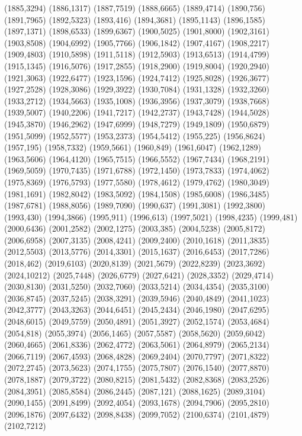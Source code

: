 (1885,3294)
(1886,1317)
(1887,7519)
(1888,6665)
(1889,4714)
(1890,756)
(1891,7965)
(1892,5323)
(1893,416)
(1894,3681)
(1895,1143)
(1896,1585)
(1897,1371)
(1898,6533)
(1899,6367)
(1900,5025)
(1901,8000)
(1902,3161)
(1903,8508)
(1904,6992)
(1905,7766)
(1906,1842)
(1907,4167)
(1908,2217)
(1909,4803)
(1910,5898)
(1911,5118)
(1912,5903)
(1913,6513)
(1914,4799)
(1915,1345)
(1916,5076)
(1917,2855)
(1918,2900)
(1919,8004)
(1920,2940)
(1921,3063)
(1922,6477)
(1923,1596)
(1924,7412)
(1925,8028)
(1926,3677)
(1927,2528)
(1928,3086)
(1929,3922)
(1930,7084)
(1931,1328)
(1932,3260)
(1933,2712)
(1934,5663)
(1935,1008)
(1936,3956)
(1937,3079)
(1938,7668)
(1939,5007)
(1940,2206)
(1941,7217)
(1942,2737)
(1943,7428)
(1944,5028)
(1945,3870)
(1946,2962)
(1947,6999)
(1948,7279)
(1949,1809)
(1950,6879)
(1951,5099)
(1952,5577)
(1953,2373)
(1954,5412)
(1955,225)
(1956,8624)
(1957,195)
(1958,7332)
(1959,5661)
(1960,849)
(1961,6047)
(1962,1289)
(1963,5606)
(1964,4120)
(1965,7515)
(1966,5552)
(1967,7434)
(1968,2191)
(1969,5059)
(1970,7435)
(1971,6788)
(1972,1450)
(1973,7833)
(1974,4062)
(1975,8369)
(1976,5793)
(1977,5580)
(1978,4612)
(1979,4762)
(1980,3049)
(1981,1691)
(1982,8042)
(1983,5092)
(1984,1508)
(1985,6008)
(1986,3485)
(1987,6781)
(1988,8056)
(1989,7090)
(1990,637)
(1991,3081)
(1992,3800)
(1993,430)
(1994,3866)
(1995,911)
(1996,613)
(1997,5021)
(1998,4235)
(1999,481)
(2000,6436)
(2001,2582)
(2002,1275)
(2003,385)
(2004,5238)
(2005,8172)
(2006,6958)
(2007,3135)
(2008,4241)
(2009,2400)
(2010,1618)
(2011,3835)
(2012,5503)
(2013,5776)
(2014,3301)
(2015,1637)
(2016,6453)
(2017,7286)
(2018,462)
(2019,6103)
(2020,8139)
(2021,5679)
(2022,8239)
(2023,3692)
(2024,10212)
(2025,7448)
(2026,6779)
(2027,6421)
(2028,3352)
(2029,4714)
(2030,8130)
(2031,5250)
(2032,7060)
(2033,5214)
(2034,4354)
(2035,3100)
(2036,8745)
(2037,5245)
(2038,3291)
(2039,5946)
(2040,4849)
(2041,1023)
(2042,3777)
(2043,3263)
(2044,6451)
(2045,2434)
(2046,1980)
(2047,6295)
(2048,6015)
(2049,5759)
(2050,4891)
(2051,3927)
(2052,1574)
(2053,4684)
(2054,818)
(2055,3974)
(2056,1465)
(2057,5587)
(2058,5620)
(2059,6042)
(2060,4665)
(2061,8336)
(2062,4772)
(2063,5061)
(2064,8979)
(2065,2134)
(2066,7119)
(2067,4593)
(2068,4828)
(2069,2404)
(2070,7797)
(2071,8322)
(2072,2745)
(2073,5623)
(2074,1755)
(2075,7807)
(2076,1540)
(2077,8870)
(2078,1887)
(2079,3722)
(2080,8215)
(2081,5432)
(2082,8368)
(2083,2526)
(2084,3951)
(2085,8584)
(2086,2445)
(2087,121)
(2088,1625)
(2089,3104)
(2090,1455)
(2091,8499)
(2092,4054)
(2093,1678)
(2094,7906)
(2095,2810)
(2096,1876)
(2097,6432)
(2098,8438)
(2099,7052)
(2100,6374)
(2101,4879)
(2102,7212)
